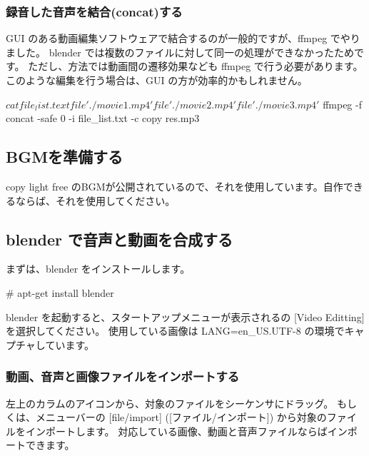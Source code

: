 \documentclass[mingoth,a4paper]{jsarticle}
\begin{document}
\subsubsection{録音した音声を結合(concat)する}

GUI のある動画編集ソフトウェアで結合するのが一般的ですが、ffmpeg でやりました。
blender では複数のファイルに対して同一の処理ができなかったためです。
ただし、方法では動画間の遷移効果なども ffmpeg で行う必要があります。
このような編集を行う場合は、GUI の方が効率的かもしれません。

\begin{commandline}
$ cat file_list.text
file './movie1.mp4'
file './movie2.mp4'
file './movie3.mp4'
$ ffmpeg -f concat -safe 0 -i file_list.txt -c copy res.mp3
\end{commandline}

%
%
%
%

\subsection{BGMを準備する}

copy light free のBGMが公開されているので、それを使用しています。自作できるならば、それを使用してください。	

\subsection{blender で音声と動画を合成する}

まずは、blender をインストールします。
\begin{commandline}
# apt-get install blender
\end{commandline}

blender を起動すると、スタートアップメニューが表示されるの [Video Editting]  を選択してください。
使用している画像は LANG=en\_US.UTF-8 の環境でキャプチャしています。

\subsubsection{動画、音声と画像ファイルをインポートする}

左上のカラムのアイコンから、対象のファイルをシーケンサにドラッグ。
もしくは、メニューバーの [file/import] ([ファイル/インポート]) から対象のファイルをインポートします。
対応している画像、動画と音声ファイルならばインポートできます。
\end{document}
